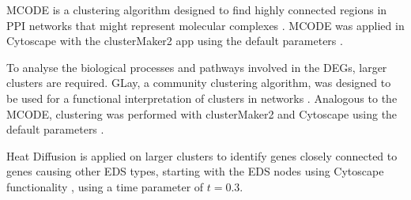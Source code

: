 \begin{description}[leftmargin=5pt]
	\begin{description}[leftmargin=0pt]
		\item[MCODE]MCODE is a clustering algorithm designed to find highly connected regions in PPI networks that might represent molecular complexes \cite{mcode}. MCODE was applied in Cytoscape with the clusterMaker2 app using the default parameters \cite{clusterMaker2}.
		
		\item[Community Clustering]To analyse the biological processes and pathways involved in the DEGs, larger clusters are required. GLay, a community clustering algorithm, was designed to be used for a functional interpretation of clusters in networks \cite{GLay}. Analogous to the MCODE, clustering was performed with clusterMaker2 and Cytoscape using the default parameters \cite{Cytoscape, clusterMaker2}.
		
		Heat Diffusion is applied on larger clusters to identify genes closely connected to genes causing other EDS types, starting with the EDS nodes using Cytoscape functionality \cite{heatDiffusion}, using a time parameter of $t=0.3$.
	\end{description}
\end{description}


